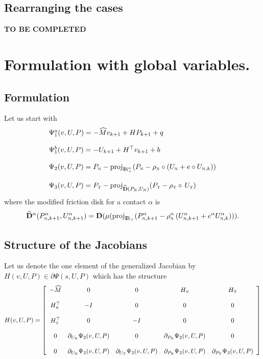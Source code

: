 \subsection{Rearranging the cases}

{\bf TO BE COMPLETED}
\section{Formulation with global variables.}

\subsection{Formulation}
Let us start with
\begin{equation}
  \label{eq:GAC-L1}
  \begin{array}{l}
  \Psi_{1}^{a}(v,U,P) =  - \widehat M v_{k+1}  +  H P_{k+1}  + q \\ \\
  \Psi_{1}^{b}(v,U,P) =  - U_{k+1}  + H^\top v _{k+1}  + b \\ \\
  \Psi_2(v,U,P) =  P_{{\hbox{\tiny{N}}}} - \operatorname{proj}_{\mathrm{I\!R}^{a}_+} (P_{{\hbox{\tiny{N}}}} - \rho_{{\hbox{\tiny{N}}}}\circ (U_{{\hbox{\tiny{N}}}} +e \circ  U_{{\hbox{\tiny{N}}},k}) ) \\ \\
  \Psi_3(v,U,P) =  P_{{\hbox{\tiny{T}}}} - \operatorname{proj}_{\widehat {\bf D}(P_{{\hbox{\tiny{N}}}},U_{{\hbox{\tiny{N}}}})} (P_{{{\hbox{\tiny{T}}}}} - \rho_{{\hbox{\tiny{T}}}}\circ \,U_{{\hbox{\tiny{T}}}} )
\end{array}
\end{equation}
where the modified friction disk for a contact $\alpha$ is
\begin{equation}\label{eq:GAC-L2}
  \widehat {\bf D}^\alpha(P^\alpha_{{\hbox{\tiny{N}}},k+1},U_{{\hbox{\tiny{N}}},k+1}^{\alpha}) = {\bf D}(\mu(\operatorname{proj}_{\mathrm{I\!R}_+} (P^\alpha_{{\hbox{\tiny{N}}},k+1} - \rho^\alpha_{{\hbox{\tiny{N}}}}\,(U_{{\hbox{\tiny{N}}},k+1}^{\alpha}+e^\alpha U_{{\hbox{\tiny{N}}},k}^{\alpha}) )).
\end{equation}

\subsection{Structure of the Jacobians}

 Let us denote the one element of the  generalized Jacobian by  $ H(v,U,P) \in \partial \Psi(s,U,P)$ which has the structure
\begin{equation}
  \label{eq:GAC-L3}
   H(v,U,P) =
   \left[\begin{array}{ccccc}
       - \widehat M & 0 & 0 & H_{{\hbox{\tiny{N}}}} & H_{{\hbox{\tiny{T}}}} \\ \\
        H_{{\hbox{\tiny{N}}}}^\top &  - I & 0 & 0 &0 \\ \\
        H_{{\hbox{\tiny{T}}}}^\top &  0  & -I & 0 &0 \\ \\
        0 & \partial_{U_{{\hbox{\tiny{N}}}}} \Psi_2(v,U,P) & 0 &   \partial_{P_{{\hbox{\tiny{N}}}}} \Psi_2(v,U,P) & 0 \\ \\
        0 & \partial_{U_{{\hbox{\tiny{N}}}}} \Psi_3(v,U,P) &  \partial_{U_{{\hbox{\tiny{T}}}}} \Psi_3(v,U,P) &  \partial_{P_{{\hbox{\tiny{N}}}}} \Psi_3(v,U,P)  & \partial_{P_{{\hbox{\tiny{T}}}}} \Psi_3(v,U,P)
   \end{array}\right]
\end{equation}

